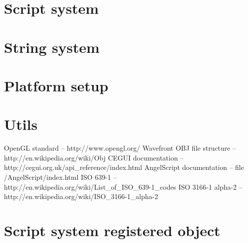 \documentclass[a4paper, 12pt]{report}
\begin{document}
\chapter{Script system}



\chapter{String system}
\label{chap:string}



\chapter{Platform setup}



\chapter{Utils}
\label{chap:utils}





\begin{thebibliography}{9}
 OpenGL standard -- http://www.opengl.org/
Wavefront OBJ file structure -- http://en.wikipedia.org/wiki/Obj
CEGUI documentation -- http://cegui.org.uk/api\_reference/index.html
AngelScript documentation -- file /AngelScript/index.html
ISO 639-1 -- http://en.wikipedia.org/wiki/List\_of\_ISO\_639-1\_codes
ISO 3166-1 alpha-2 -- http://en.wikipedia.org/wiki/ISO\_3166-1\_alpha-2
\end{thebibliography}



\clearpage
{}
\listoffigures

\clearpage
{}
\listoftables

\appendix

\chapter{Script system registered object}


\end{document}
